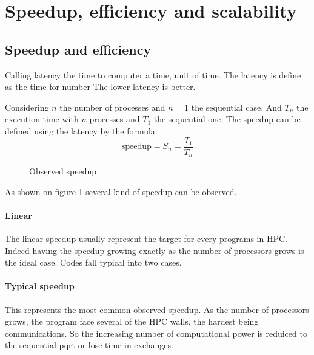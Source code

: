 \section{Speedup, efficiency and scalability}

\subsection{Speedup and efficiency}
Calling latency the time to computer a time, unit of time. 
The latency is define as the time for number
The lower latency is better. 

Considering $n$ the number of processes and $n=1$ the sequential case.
And $T_n$ the execution time with $n$ processes and $T_1$ the sequential one. 
The speedup can be defined using the latency by the formula: 
\begin{equation}
\text{speedup} = S_n =  \frac{T_1}{T_n}
\end{equation}


\begin{figure}
\centering 
{}
\caption{Observed speedup}
\label{fig:1_HPC:speedup_obs}
\end{figure}

As shown on figure \ref{fig:1_HPC:speedup_obs} several kind of speedup can be observed. 
\paragraph{Linear}
The linear speedup usually represent the target for every programs in HPC. 
Indeed having the speedup growing exactly as the number of processors grows is the ideal case. 
Codes fall typical into two cases. 
\paragraph{Typical speedup}
This represents the most common observed speedup. 
As the number of processors grows, the program face several of the HPC walls, the hardest being communications.
So the increasing number of computational power is reduiced to the sequential pqrt or lose time in exchanges. 
